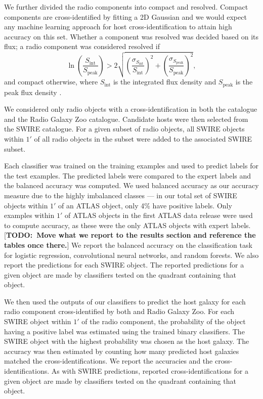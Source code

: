 \documentclass[fleqn,usenatbib,usedcolumn]{mnras}
\newcommand{\text}{\mathrm}
\newcommand{\todo}[1]{ {\color{red}[{\bf TODO:~{#1}}]} }
\begin{document}
    We further divided the radio components into compact and resolved. Compact
    components are cross-identified by fitting a 2D Gaussian \citep[as
    in][]{norris06} and we would expect any machine learning approach for host
    cross-identification to attain high accuracy on this set. Whether a
    component was resolved was decided based on its flux; a radio component was
    considered resolved if
    \begin{equation}
        \ln \left(
          \frac{S_{\text{int}}}
               {S_{\text{peak}}}
        \right) > 2\sqrt{\left(
          \frac{\sigma_{S_{\text{int}}}}
               {S_{\text{int}}}
        \right)^2 + \left(
          \frac{\sigma_{S_{\text{peak}}}}
               {S_{\text{peak}}}
        \right)^2},
    \end{equation}%
    and compact otherwise, where \(S_{\text{int}}\) is the integrated flux
    density and \(S_{\text{peak}}\) is the peak flux density
    \citep{franzen15}.

    We considered only radio objects with a cross-identification in both the
    \citet{norris06} catalogue and the Radio Galaxy Zoo catalogue. Candidate
    hosts were then selected from the SWIRE catalogue. For a given subset of
    radio objects, all SWIRE objects within $1'$ of all radio objects in the
    subset were added to the associated SWIRE subset.

    Each classifier was trained on the training examples and used to predict
    labels for the test examples. The predicted labels were compared to the
    expert labels and the balanced accuracy was computed. We used balanced
    accuracy as our accuracy measure due to the highly imbalanced classes --- in
    our total set of SWIRE objects within $1'$ of an ATLAS object, only 4\% have
    positive labels. Only examples within $1'$ of ATLAS objects in the first
    ATLAS data release \citep{norris06} were used to compute accuracy, as these
    were the only ATLAS objects with expert labels. \todo{Move what we report to
    the results section and reference the tables once there.} We report the
    balanced accuracy on the classification task for logistic regression,
    convolutional neural networks, and random forests. We also report the
    predictions for each SWIRE object. The reported predictions for a given
    object are made by classifiers tested on the quadrant containing that
    object.

    We then used the outputs of our classifiers to predict the host galaxy
    for each radio component cross-identified by both \citet{norris06}
    and Radio Galaxy Zoo. For each SWIRE object within $1'$ of the radio
    component, the probability of the object having a positive label was
    estimated using the trained binary classifiers. The SWIRE object with
    the highest probability was chosen as the host galaxy. The accuracy was
    then estimated by counting how many predicted host galaxies matched the
    \citet{norris06} cross-identifications. We report the accuracies and the
    cross-identifications. As with SWIRE predictions, reported
    cross-identifications for a given object are made by classifiers tested
    on the quadrant containing that object.
\end{document}
